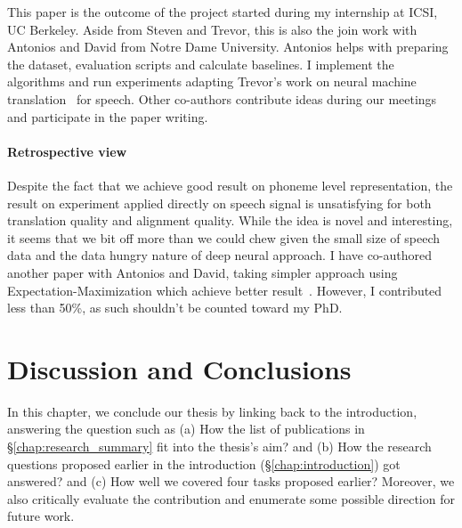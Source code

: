 \documentclass[12pt,twoside,final,hidelinks]{ltthesis}
\theoremstyle{definition}
\begin{document}
This paper is the outcome of the project started during my internship at ICSI, UC Berkeley. Aside from Steven and Trevor, this is also the join work with Antonios and David from Notre Dame University. Antonios helps with preparing the dataset, evaluation scripts and calculate baselines. I implement the algorithms and run experiments adapting Trevor's work on neural machine translation~\cite{cohn-EtAl:2016:N16-1} for speech. Other co-authors contribute ideas during our meetings and participate in the paper writing. 

\subsubsection{Retrospective view}
Despite the fact that we achieve good result on phoneme level representation, the result on experiment applied directly on speech signal is unsatisfying for both 
translation quality and alignment quality. While the idea is novel and interesting, it seems that we bit off more than we could chew given the small size of speech 
data and the data hungry nature of deep neural approach. I have co-authored another paper with Antonios and David, taking simpler approach using Expectation-Maximization which achieve better result~\cite{anastasopoulos-chiang-duong:2016:EMNLP2016}. However, I contributed less than 50\%, as such shouldn't be counted toward my PhD.




\chapter{Discussion and Conclusions}
\label{sec:conclusion}
In this chapter, we conclude our thesis by linking back to the introduction, answering the question such as (a) How the list of publications in \S\ref{chap:research_summary} fit into the thesis's aim? and (b) How the research questions proposed earlier in the introduction (\S\ref{chap:introduction}) got 
answered? and (c) How well we covered four tasks proposed earlier? Moreover, we also critically evaluate the contribution and enumerate some possible direction
for future work. 
\end{document}
